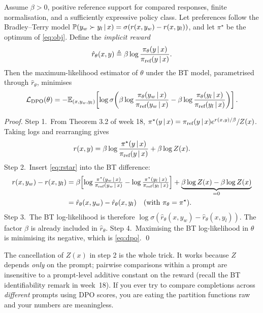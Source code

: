 \documentclass[11pt,oneside]{scrbook}
\begin{document}
\begin{theorem}
\label{thm:dpo}
Assume $\beta>0$, positive reference support for compared responses, finite normalisation, and a sufficiently expressive policy class. Let preferences follow the Bradley--Terry model
$\mathbb{P}(y_w \succ y_l \,\vert\, x) = \sigma(r(x,y_w) - r(x,y_l))$, and let
$\pi^\star$ be the optimum of \eqref{eq:obj}. Define the
\emph{implicit reward}
\[
\hat r_\theta(x, y) \triangleq \beta \log\frac{\pi_\theta(y \,\vert\, x)}{\pi_{\text{ref}}(y \,\vert\, x)}.
\]
Then the maximum-likelihood estimator of $\theta$ under the BT model,
parametrised through $\hat r_\theta$, minimises
\begin{equation}
\mathcal{L}_{\text{DPO}}(\theta) =
  -\mathbb{E}_{(x, y_w, y_l)}\!\left[\log\sigma\!\left(
    \beta\log\frac{\pi_\theta(y_w \,\vert\, x)}{\pi_{\text{ref}}(y_w \,\vert\, x)}
    -
    \beta\log\frac{\pi_\theta(y_l \,\vert\, x)}{\pi_{\text{ref}}(y_l \,\vert\, x)}
  \right)\right].
\label{eq:dpo}
\end{equation}
\end{theorem}

\begin{proof}
Step 1.\ From Theorem 3.2 of week 18,
$\pi^\star(y \,\vert\, x) = \pi_{\text{ref}}(y \,\vert\, x) e^{r(x,y)/\beta} / Z(x)$.
Taking logs and rearranging gives
\begin{equation}
r(x, y) = \beta \log\frac{\pi^\star(y \,\vert\, x)}{\pi_{\text{ref}}(y \,\vert\, x)}
           + \beta \log Z(x).
\label{eq:rstar}
\end{equation}
Step 2.\ Insert \eqref{eq:rstar} into the BT difference:
\begin{align*}
r(x, y_w) - r(x, y_l)
&= \beta\!\left[\log\tfrac{\pi^\star(y_w \,\vert\, x)}{\pi_{\text{ref}}(y_w \,\vert\, x)} - \log\tfrac{\pi^\star(y_l \,\vert\, x)}{\pi_{\text{ref}}(y_l \,\vert\, x)}\right] + \underbrace{\beta \log Z(x) - \beta \log Z(x)}_{= 0} \\
&= \hat r_\theta(x, y_w) - \hat r_\theta(x, y_l) \quad\text{(with $\pi_\theta = \pi^\star$).}
\end{align*}
Step 3.\ The BT log-likelihood is therefore
$\log\sigma(\hat r_\theta(x, y_w) - \hat r_\theta(x, y_l))$. The factor $\beta$ is already included in $\hat r_\theta$.
Step 4.\ Maximising the BT log-likelihood in $\theta$ is minimising
its negative, which is \eqref{eq:dpo}. \qed
\end{proof}

\begin{remark}
The cancellation of $Z(x)$ in step 2 is the whole trick. It works
because $Z$ depends \emph{only} on the prompt; pairwise comparisons
within a prompt are insensitive to a prompt-level additive constant
on the reward (recall the BT identifiability remark in week~18). If
you ever try to compare completions across \emph{different} prompts
using DPO scores, you are eating the partition functions raw and
your numbers are meaningless.
\end{remark}
\end{document}
